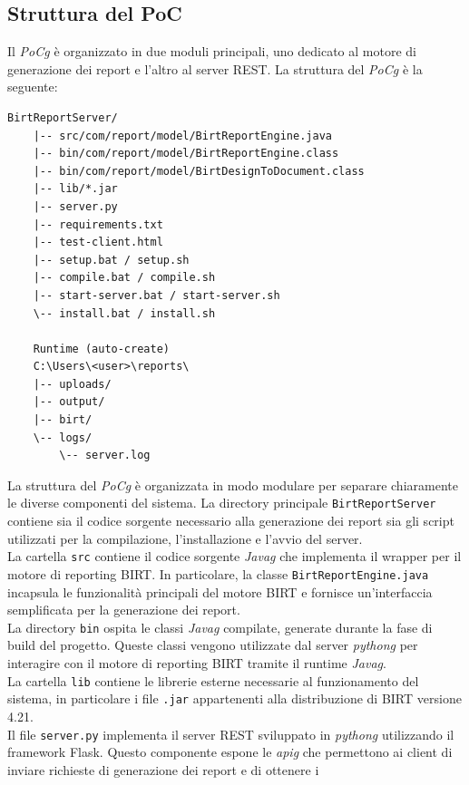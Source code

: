     \subsection{Struttura del PoC}
    \label{sec:struttura-poc}
    Il \emph{\gls{PoCg}} è organizzato in due moduli principali, uno dedicato al motore di generazione dei report e l'altro al server REST. La struttura del \emph{\gls{PoCg}} è la seguente:
    \begin{lstlisting}[style=tree]
    BirtReportServer/
    |-- src/com/report/model/BirtReportEngine.java
    |-- bin/com/report/model/BirtReportEngine.class
    |-- bin/com/report/model/BirtDesignToDocument.class
    |-- lib/*.jar
    |-- server.py
    |-- requirements.txt
    |-- test-client.html
    |-- setup.bat / setup.sh
    |-- compile.bat / compile.sh
    |-- start-server.bat / start-server.sh
    \-- install.bat / install.sh

    Runtime (auto-create)
    C:\Users\<user>\reports\
    |-- uploads/
    |-- output/
    |-- birt/
    \-- logs/
        \-- server.log
    \end{lstlisting}
La struttura del \emph{\gls{PoCg}} è organizzata in modo modulare per separare chiaramente le diverse componenti del sistema.
La directory principale \texttt{BirtReportServer} contiene sia il codice sorgente
necessario alla generazione dei report sia gli script utilizzati per la compilazione,
l'installazione e l'avvio del server.\\
La cartella \texttt{src} contiene il codice sorgente \emph{\gls{Javag}} che implementa il
wrapper per il motore di reporting BIRT. In particolare, la classe
\texttt{BirtReportEngine.java} incapsula le funzionalità principali del motore
BIRT e fornisce un'interfaccia semplificata per la generazione dei report.\\
La directory \texttt{bin} ospita le classi \emph{\gls{Javag}} compilate, generate durante la
fase di build del progetto. Queste classi vengono utilizzate dal server \emph{\gls{pythong}}
per interagire con il motore di reporting BIRT tramite il runtime \emph{\gls{Javag}}.\\
La cartella \texttt{lib} contiene le librerie esterne necessarie al funzionamento
del sistema, in particolare i file \texttt{.jar} appartenenti alla distribuzione
di BIRT versione 4.21.\\
Il file \texttt{server.py} implementa il server REST sviluppato in \emph{\gls{pythong}}
utilizzando il framework Flask. Questo componente espone le \emph{\gls{apig}} che permettono
ai client di inviare richieste di generazione dei report e di ottenere i
